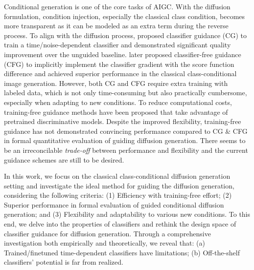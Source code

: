 \documentclass{article}
\theoremstyle{definition}
\begin{document}
Conditional generation is one of the core tasks of AIGC.
With the diffusion formulation, condition injection, especially the classical class condition, becomes more transparent as it can be modeled as an extra term during the reverse process. 
To align with the diffusion process, \cite{dhariwal2021diffusion} proposed classifier guidance (CG) to train a time/noise-dependent classifier and demonstrated significant quality improvement over the unguided baseline. 
\cite{ho2022classifier} later proposed classifier-free guidance (CFG) to implicitly implement the classifier gradient with the score function difference and achieved superior performance in the classical class-conditional image generation. 
However, both CG and CFG require extra training with labeled data, which is not only time-consuming but also practically cumbersome, especially when adapting to new conditions. 
To reduce computational costs, training-free guidance methods have been proposed \citep{bansal2023universal} that take advantage of pretrained discriminative models.
Despite the improved flexibility, training-free guidance has not demonstrated convincing performance compared to CG \& CFG in formal quantitative evaluation of guiding diffusion generation.  
There seems to be an irreconcilable \textit{trade-off} between performance and flexibility and the current guidance schemes are still to be desired. 


In this work, we focus on the classical class-conditional diffusion generation setting and investigate the ideal method for guiding the diffusion generation, considering the following criteria:
(1) Efficiency with training-free effort;
(2) Superior performance in formal evaluation of guided conditional diffusion generation;
and (3) Flexibility and adaptability to various new conditions.
To this end, we delve into the properties of classifiers and rethink the design space of classifier guidance for diffusion generation. 
Through a comprehensive investigation both empirically and theoretically, we reveal that: (a) Trained/finetuned time-dependent classifiers have limitations; (b) Off-the-shelf classifiers' potential is far from realized.
\end{document}

